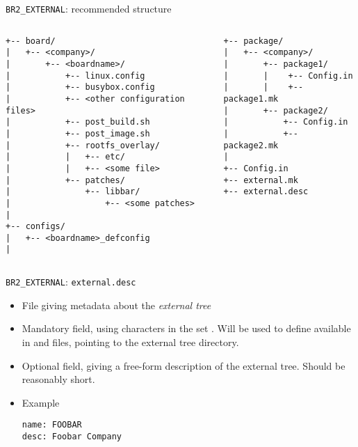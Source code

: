 \begin{frame}[fragile]{{\tt BR2\_EXTERNAL}: recommended structure}
  \footnotesize
  \begin{columns}[b]
  \begin{block}{}
\begin{verbatim}
+-- board/
|   +-- <company>/
|       +-- <boardname>/
|           +-- linux.config
|           +-- busybox.config
|           +-- <other configuration files>
|           +-- post_build.sh
|           +-- post_image.sh
|           +-- rootfs_overlay/
|           |   +-- etc/
|           |   +-- <some file>
|           +-- patches/
|               +-- libbar/
|                   +-- <some patches>
|
+-- configs/
|   +-- <boardname>_defconfig
|
\end{verbatim}
   \end{block}
   \begin{block}{}
\begin{verbatim}
+-- package/
|   +-- <company>/
|       +-- package1/
|       |    +-- Config.in
|       |    +-- package1.mk
|       +-- package2/
|           +-- Config.in
|           +-- package2.mk
|
+-- Config.in
+-- external.mk
+-- external.desc
\end{verbatim}
   \end{block}
   \end{columns}
\end{frame}

\begin{frame}[fragile]{{\tt BR2\_EXTERNAL}: {\tt external.desc}}

  \begin{itemize}
  \item File giving metadata about the {\em external tree}
  \item Mandatory
     field, using characters in the set
    \code{[A-Za-z0-9_]}. Will be used to define
     available in
     and  files, pointing
    to the external tree directory.
  \item Optional
     field, giving a free-form description of the external tree. Should be reasonably short.
  \item Example
    \begin{block}{}
\begin{verbatim}
name: FOOBAR
desc: Foobar Company
\end{verbatim}
    \end{block}
  \end{itemize}

\end{frame}

